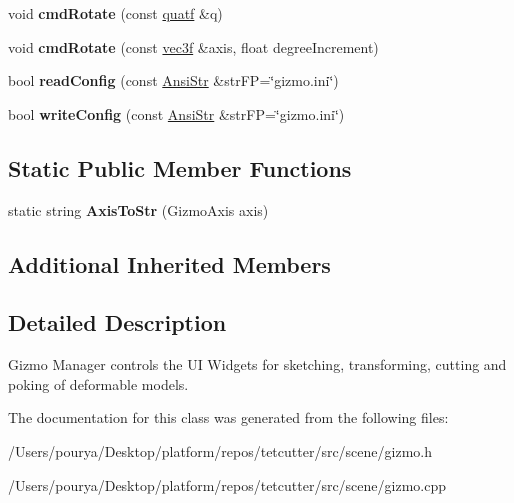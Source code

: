 \begin{DoxyCompactItemize}
\item 
\hypertarget{classps_1_1scene_1_1GizmoManager_a51a49044f0e3bca22b2717e8c66b568c}{}void {\bfseries cmd\+Rotate} (const \hyperlink{classps_1_1base_1_1Quaternion}{quatf} \&q)\label{classps_1_1scene_1_1GizmoManager_a51a49044f0e3bca22b2717e8c66b568c}

\item 
\hypertarget{classps_1_1scene_1_1GizmoManager_a00c8994957394b31765cc087fe96351c}{}void {\bfseries cmd\+Rotate} (const \hyperlink{classps_1_1base_1_1Vec3}{vec3f} \&axis, float degree\+Increment)\label{classps_1_1scene_1_1GizmoManager_a00c8994957394b31765cc087fe96351c}

\item 
\hypertarget{classps_1_1scene_1_1GizmoManager_a4118cdc5199d3571d4d84830ba8db6bd}{}bool {\bfseries read\+Config} (const \hyperlink{classps_1_1base_1_1CAString}{Ansi\+Str} \&str\+F\+P=\char`\"{}gizmo.\+ini\char`\"{})\label{classps_1_1scene_1_1GizmoManager_a4118cdc5199d3571d4d84830ba8db6bd}

\item 
\hypertarget{classps_1_1scene_1_1GizmoManager_ad536d72a9044cf766ea37e15d4bd1dfa}{}bool {\bfseries write\+Config} (const \hyperlink{classps_1_1base_1_1CAString}{Ansi\+Str} \&str\+F\+P=\char`\"{}gizmo.\+ini\char`\"{})\label{classps_1_1scene_1_1GizmoManager_ad536d72a9044cf766ea37e15d4bd1dfa}

\end{DoxyCompactItemize}
\subsection*{Static Public Member Functions}
\begin{DoxyCompactItemize}
\item 
\hypertarget{classps_1_1scene_1_1GizmoManager_adabbb5340c1de475e7e0bb25034f95b2}{}static string {\bfseries Axis\+To\+Str} (Gizmo\+Axis axis)\label{classps_1_1scene_1_1GizmoManager_adabbb5340c1de475e7e0bb25034f95b2}

\end{DoxyCompactItemize}
\subsection*{Additional Inherited Members}


\subsection{Detailed Description}
Gizmo Manager controls the U\+I Widgets for sketching, transforming, cutting and poking of deformable models. 

The documentation for this class was generated from the following files\+:\begin{DoxyCompactItemize}
\item 
/\+Users/pourya/\+Desktop/platform/repos/tetcutter/src/scene/gizmo.\+h\item 
/\+Users/pourya/\+Desktop/platform/repos/tetcutter/src/scene/gizmo.\+cpp\end{DoxyCompactItemize}
